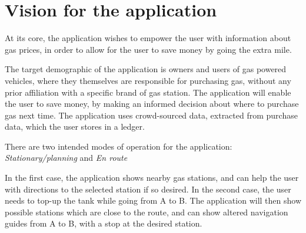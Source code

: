 
\chapter{Vision for the application}
At its core, the application wishes to empower the user with information about gas prices, in order to allow for the user to save money by going the extra mile.

The target demographic of the application is owners and users of gas powered vehicles, where they themselves are responsible for purchasing gas, without any prior affiliation with a specific brand of gas station. The application will enable the user to save money, by making an informed decision about where to purchase gas next time.  The application uses crowd-sourced data, extracted from purchase data, which the user stores in a ledger.

There are two intended modes of operation for the application:	\emph{Stationary/planning} and \emph{En route}

In the first case, the application shows nearby gas stations, and can help the user with directions to the selected station if so desired. In the second case, the user needs to top-up the tank while going from A to B. The application will then show possible stations which are close to the route, and can show altered navigation guides from A to B, with a stop at the desired station.


